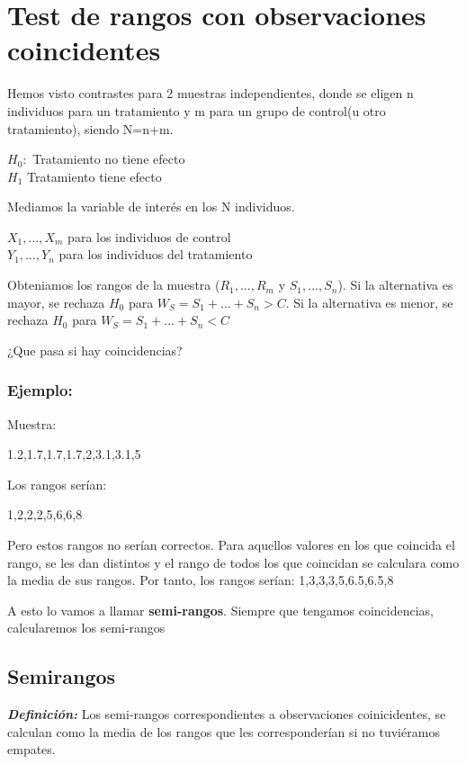 \section{Test de rangos con observaciones coincidentes}

Hemos visto contrastes para 2 muestras independientes, donde se eligen n individuos para un tratamiento y m para un grupo de control(u otro tratamiento), siendo N=n+m.
\begin{center}
    $H_0: $ Tratamiento no tiene efecto \\
    $H_1$ Tratamiento tiene efecto
\end{center}

Mediamos la variable de interés en los N individuos.
\begin{center}
    $X_1,\dots,X_m$ para los individuos de control \\
    $Y_1,\dots,Y_n$ para los individuos del tratamiento
\end{center}

Obteniamos los rangos de la muestra ($R_1,\dots,R_m$ y $S_1,\dots,S_n$).
Si la alternativa es mayor, se rechaza $H_0$ para $W_S=S_1+\dots+S_n>C$.
Si la alternativa es menor, se rechaza $H_0$ para $W_S=S_1+\dots+S_n<C$


¿Que pasa si hay coincidencias?
\subsubsection*{Ejemplo: }
Muestra: 
\begin{center}
    1.2,1.7,1.7,1.7,2,3.1,3.1,5
\end{center}

Los rangos serían:

\begin{center}
1,2,2,2,5,6,6,8
\end{center}

Pero estos rangos no serían correctos. Para aquellos valores en los que coincida el rango, se les dan distintos y el rango de todos los que coincidan se calculara como la media de sus rangos. Por tanto, los rangos serían:
1,3,3,3,5,6.5,6.5,8

A esto lo vamos a llamar \textbf{semi-rangos}. Siempre que tengamos coincidencias, calcularemos los semi-rangos
\subsection{Semirangos}
\textbf{\textit{Definición: }}Los semi-rangos correspondientes a observaciones coinicidentes, se calculan como la media de los rangos que les corresponderían si no tuviéramos empates.

